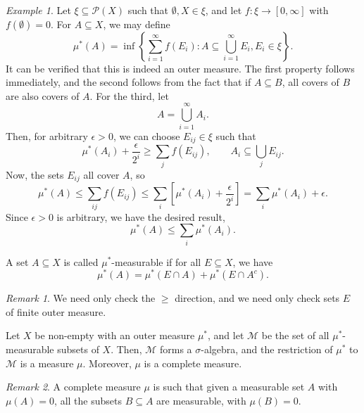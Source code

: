 \documentclass[11pt]{article}
\newcommand{\M}{\mathcal{M}}
\theoremstyle{definition}
\theoremstyle{remark}
\newtheorem*{remark}{Remark}
\newtheorem*{example}{Example}
\numberwithin{equation}{section}
\begin{document}
    \begin{example}
        Let $\xi \subseteq \mathcal{P}(X)$ such that $\emptyset, X \in \xi$, and let
        $f\colon \xi \to [0, \infty]$ with $f(\emptyset) = 0$. For $A \subseteq X$,
        we may define \[
            \mu^*(A) = \inf\left\{\sum_{i = 1}^\infty f(E_i) : A \subseteq \bigcup_{i
            = 1}^\infty E_i, E_i \in \xi\right\}.
        \] It can be verified that this is indeed an outer measure. The first
        property follows immediately, and the second follows from the fact that if
        $A\subseteq B$, all covers of $B$ are also covers of $A$. For the third, let
        \[
            A = \bigcup_{i = 1}^\infty A_i.
        \] Then, for arbitrary $\epsilon > 0$, we can choose $E_{ij} \in \xi$ such
        that \[
            \mu^*(A_i) + \frac{\epsilon}{2^i} \geq \sum_j f(E_{ij}), \qquad
            A_i \subseteq \bigcup_j E_{ij}.
        \] Now, the sets $E_{ij}$ all cover $A$, so \[
            \mu^*(A) \leq \sum_{ij} f(E_{ij}) \leq \sum_i \left[\mu^*(A_i) +
            \frac{\epsilon}{2^i}\right] = \sum_i \mu^*(A_i) + \epsilon.
        \] Since $\epsilon > 0$ is arbitrary, we have the desired result, \[
            \mu^*(A) \leq \sum_i \mu^*(A_i).
        \]
    \end{example}

    \begin{definition}
        A set $A \subseteq X$ is called $\mu^*$-measurable if for all $E \subseteq
        X$, we have \[
            \mu^*(A) = \mu^*(E \cap A) + \mu^*(E \cap A^c).
        \]
        \begin{remark}
            We need only check the $\geq$ direction, and we need only check sets $E$
            of finite outer measure.
        \end{remark}
    \end{definition}

    \begin{theorem}
        Let $X$ be non-empty with an outer measure $\mu^*$, and let $\M$ be the set
        of all $\mu^*$-measurable subsets of $X$. Then, $\M$ forms a
        $\sigma$-algebra, and the restriction of $\mu^*$ to $\M$ is a measure $\mu$.
        Moreover, $\mu$ is a complete measure.

        \begin{remark}
            A complete measure $\mu$ is such that given a measurable set $A$ with
            $\mu(A) = 0$, all the subsets $B \subseteq A$ are measurable, with
            $\mu(B) = 0$.
        \end{remark}
    \end{theorem}
\end{document}
